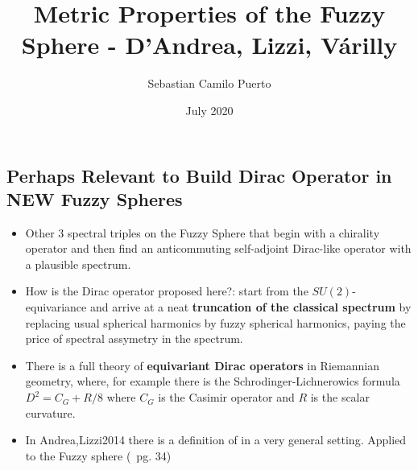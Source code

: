 \documentclass{article}
\title{Metric Properties of the Fuzzy Sphere - D'Andrea, Lizzi, V\'arilly}
\author{Sebastian Camilo Puerto}
\date{July 2020}
\begin{document}
\maketitle

\tableofcontents


\subsection{Perhaps Relevant to Build Dirac Operator in NEW Fuzzy Spheres}

    \begin{itemize}

    \item Other $3$ spectral triples on the Fuzzy Sphere that begin with a chirality operator and then find an anticommuting self-adjoint Dirac-like operator with a plausible spectrum.
    
    \item How is the Dirac operator proposed here?: start from the $SU(2)$-equivariance and arrive at a neat \textbf{truncation of the classical spectrum} by replacing usual spherical harmonics by fuzzy spherical harmonics, paying the price of spectral assymetry in the spectrum.
    
    \item There is a full theory of \textbf{equivariant Dirac operators} in Riemannian geometry, where, for example there is the Schrodinger-Lichnerowics formula $D^2 = C_G + R/8$ where $C_G$ is the Casimir operator and $R$ is the scalar curvature.
    
    \item In Andrea,Lizzi2014 there is a definition of  in a very general setting. Applied to the Fuzzy sphere (~pg. 34) \textbf{}  
    
    \end{itemize}

\end{document}
